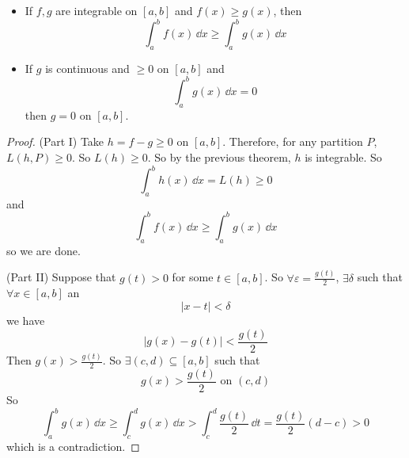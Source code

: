 \documentclass{report}
\begin{document}
\begin{theorem}{33.4}
    \begin{itemize}
        \item If $f, g$ are integrable on $[a, b]$ and $f(x) \geq g( x)$, then 
            \begin{equation*}
                \int_{a}^{b} f(x) \, \dd{x}  \geq \int_{ a}^{b} g(x) \, \dd{x} 
            \end{equation*}

        \item If $g$ is continuous and $\geq 0$ on $[a, b]$ and 
            \begin{equation*}
                \int_{a}^{b} g(x) \, \dd{x} = 0
            \end{equation*}
        then $g = 0$ on $[a, b]$.
    \end{itemize}
\end{theorem}
    \begin{proof}
        (Part I) Take $h = f - g \geq 0$ on $ [a, b]$. Therefore, for any partition $P$, $L(h, P) \geq 0$. So $L(h) \geq 0$. So by the previous theorem, $h$ is integrable. So
            \begin{equation*}
                \int_{a}^{b} h(x) \, \dd{x}  = L(h) \geq 0
            \end{equation*}
        and
            \begin{equation*}
                \int_{a}^{b} f(x) \, \dd{x} \geq \int_{ a}^{b} g(x) \, \dd{x} 
            \end{equation*}
        so we are done.

        (Part II) Suppose that $g(t) > 0$ for some $ t \in [ a, b]$. So $\forall \varepsilon = \frac{g(t)}{2}$, $\exists \delta$ such that $\forall x \in  [ a, b]$ an
            \begin{equation*}
                \lvert x - t \rvert <  \delta
            \end{equation*}  
        we have
            \begin{equation*}
                \lvert g(x) - g(t) \rvert <  \dfrac{ g(t)}{2}
            \end{equation*}
        Then $g(x) > \frac{ g(t)}{2}$. So $\exists ( c, d) \subseteq [ a, b]$ such that 
            \begin{equation*}
                g(x) >\dfrac{ g(t)}{2} \text{ on } (c, d)
            \end{equation*}
        So
            \begin{equation*}
                \int_{a}^{b} g(x) \, \dd{x} \geq \int_{c}^{d} g(x) \, \dd{x} > \int_{ c}^{d} \dfrac{g(t)}{2} \, \dd{t} = \dfrac{g(t)}{2}(d - c) > 0
            \end{equation*}
        which is a contradiction.
    \end{proof}
\end{document}
